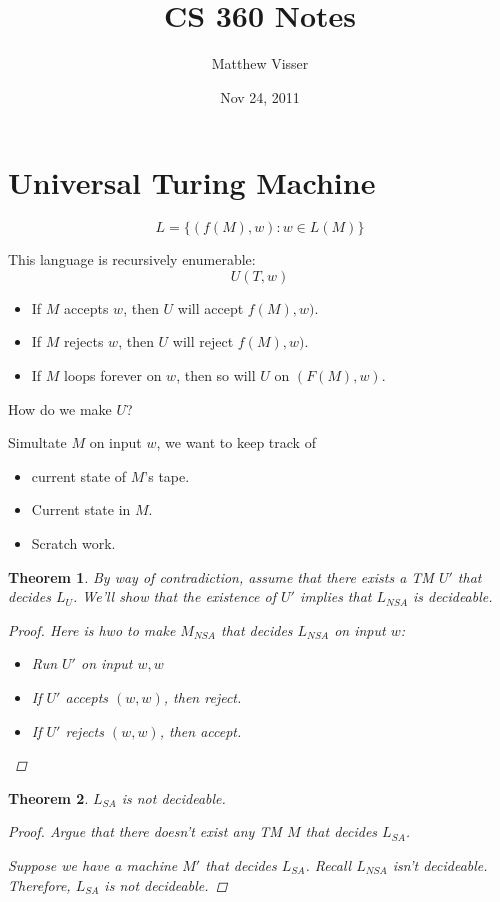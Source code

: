 \documentclass[12pt]{article}
\newtheorem{thm}{Theorem}
\theoremstyle{definition}
\begin{document}
\title{CS 360 Notes}
\author{Matthew Visser}
\date{Nov 24, 2011}
\maketitle

\section{Universal Turing Machine}

\begin{equation}
	L = \{(f(M),w):w \in L(M) \}
\end{equation}

This language is recursively enumerable:
\[U(T,w)\]
\begin{itemize}
	\item If $M$ accepts $w$, then $U$ will accept $f(M),w)$.
	\item If $M$ rejects $w$, then $U$ will reject $f(M),w)$.
	\item If $M$ loops forever on $w$, then so will $U$ on $(F(M),w)$.
\end{itemize}

How do we make $U$?

Simultate $M$ on input $w$, we want to keep track of
\begin{itemize}
	\item current state of $M$'s tape.
	\item Current state in $M$.
	\item Scratch work.
\end{itemize}

\begin{thm}
	By way of contradiction, assume that there exists a TM $U'$ that decides
	$L_U$. We'll show that the existence of $U'$ implies that $L_{NSA}$ is
	decideable.

	\begin{proof}
		Here is hwo to make $M_{NSA}$ that decides $L_{NSA}$ on input $w$:
		\begin{itemize}
			\item Run $U'$ on input $w,w$
			\item If $U'$ accepts $(w,w)$, then reject.
			\item If $U'$ rejects $(w,w)$, then accept.
		\end{itemize}
	\end{proof}
\end{thm}

\begin{thm}
	$L_{SA}$ is not decideable.
	\begin{proof}
		Argue that there doesn't exist any TM $M$ that decides $L_{SA}$.

		Suppose we have a machine $M'$ that decides $L_{SA}$. Recall
		$L_{NSA}$ isn't decideable. Therefore, $L_{SA}$ is not decideable.
	\end{proof}
\end{thm}
\end{document}
